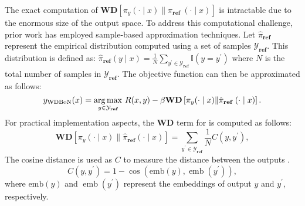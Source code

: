 The exact computation of $\textbf{WD}\left[\pi_y(\cdot \mid x) \| \pi_{\textbf{ref }}(\cdot \mid x)\right]$ is intractable due to the enormous size of the output space. To address this computational challenge, prior work \citep{jinnai2024regularized} has employed sample-based approximation techniques.
Let $\hat{\pi}_{\textbf{ref}}$ represent the empirical distribution computed using a set of samples $\mathcal{Y}_{\textbf{ref}}$. This distribution is defined as:
$\hat{\pi}_{\textbf{ref}}(y \mid x) = \frac{1}{N} \sum_{y^{\prime} \in \mathcal{Y}_{\textbf{ref}}} \mathbb{I}\left(y = y^{\prime}\right)$
where $N$ is the total number of samples in $\mathcal{Y_{\textbf{ref}}}$.
The objective function can then be approximated as follows:
\begin{equation*}
y_{\mathrm{WDBoN}}(x) = \operatorname*{arg\,max}_{y \in \mathcal{Y_{\textbf{ref}}}} \,R(x, y)-\beta \textbf{WD}\left[\pi_y(\cdot \mid x) \| \hat{\pi}_{\textbf{ref }}(\cdot \mid x)\right].
\end{equation*}
For practical implementation aspects, the $\textbf{WD}$ term for \citet{jinnai2024regularized} is computed as follows:
\begin{equation}\label{eq:wd_N}
\textbf{WD}\left[\pi_y(\cdot \mid x) \| \hat{\pi}_{\textbf{ref}}(\cdot \mid x)\right]=\sum_{y^{\prime} \in \mathcal{Y}_{\textbf {ref}}} \frac{1}{N} C\left(y, y^{\prime}\right),
\end{equation}
The cosine distance is used as $C$ to measure the distance between the outputs \citep{reimers-gurevych-2019-sentence}.
\begin{equation}\label{eq:similarity}
C\left(y, y^{\prime}\right)=1-\cos \left(\mathrm{emb}(y), \operatorname{emb}\left(y^{\prime}\right)\right),
\end{equation}
where $\mathrm{emb}(y)$ and $\operatorname{emb}\left(y^{\prime}\right)$ represent the embeddings of output $y$ and $y^{\prime}$, respectively. 




